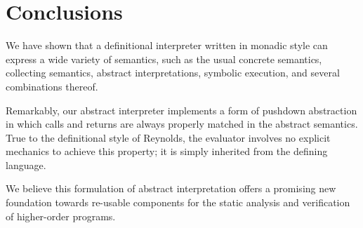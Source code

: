 \section{Conclusions}\label{s:conclusion}

We have shown that a definitional interpreter written in monadic style can
express a wide variety of semantics, such as the usual concrete semantics,
collecting semantics, abstract interpretations, symbolic execution, and several
combinations thereof. 

Remarkably, our abstract interpreter implements a form of pushdown abstraction
in which calls and returns are always properly matched in the abstract
semantics.  True to the definitional style of Reynolds, the evaluator involves
no explicit mechanics to achieve this property; it is simply inherited from the
defining language.

We believe this formulation of abstract interpretation offers a promising new
foundation towards re-usable components for the static analysis and
verification of higher-order programs.

